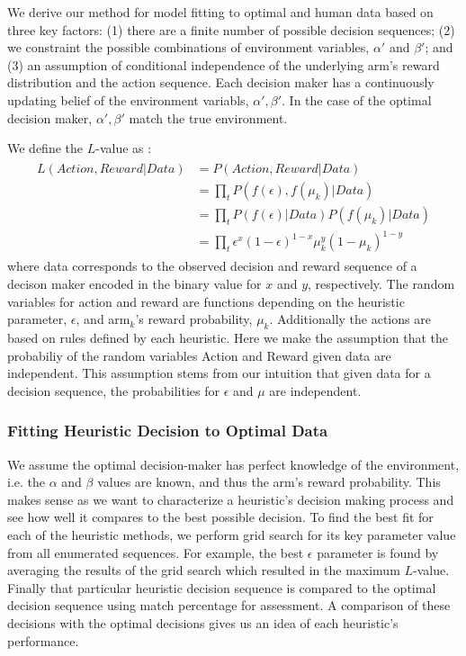 We derive our method for model fitting to optimal and human data based on three key factors: (1) there are a finite number of possible decision sequences; (2) we constraint the possible combinations of environment variables, $\alpha'$ and $\beta'$; and (3) an assumption of conditional independence of the underlying arm's reward distribution and the action sequence. Each decision maker has a continuously updating belief of the environment variabls, $\alpha',\beta'$. In the case of the optimal decision maker, $\alpha',\beta'$ match the true environment.

We define the $L$-value as :
\begin{align}
\begin{split}
	\label{eq:likelihood} 
	L(Action,Reward|Data) &= P(Action,Reward|Data) \\
						  &= \prod_{t} P(f(\epsilon),f(\mu_k)|Data) \\
						  &= \prod_{t} P(f(\epsilon)|Data) P(f(\mu_k)|Data) \\	
						  &= \prod_{t} \epsilon^x (1-\epsilon)^{1-x} \mu_k^y (1-\mu_k)^{1-y}
\end{split}
\end{align}
where data corresponds to the observed decision and reward sequence of a decison maker encoded in the binary value for $x$ and $y$, respectively. The random variables for action and reward are functions depending on the heuristic parameter, $\epsilon$, and arm$_k$'s reward probability, $\mu_k$. Additionally the actions are based on rules defined by each heuristic. Here we make the assumption that the probabiliy of the random variables Action and Reward given data are independent. This assumption stems from our intuition that given data for a decision sequence, the probabilities for $\epsilon$ and $\mu$ are independent. 

\subsubsection{Fitting Heuristic Decision to Optimal Data}
We assume the optimal decision-maker has perfect knowledge of the environment, i.e. the $\alpha$ and $\beta$ values are known, and thus the arm's reward probability. This makes sense as we want to characterize a heuristic's decision making process and see how well it compares to the best possible decision. To find the best fit for each of the heuristic methods, we perform grid search for its key parameter value from all enumerated sequences. For example, the best $\epsilon$ parameter is found by averaging the results of the grid search which resulted in the maximum $L$-value. Finally that particular heuristic decision sequence is compared to the optimal decision sequence using match percentage for assessment. A comparison of these decisions with the optimal decisions gives us an idea of each heuristic's performance.

